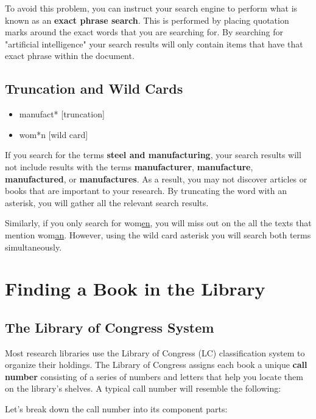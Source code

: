 {To avoid this problem, you can instruct your search engine to perform what is 
known as an \textbf{exact phrase search}. This is performed by placing 
quotation marks around the exact words that you are searching for. By searching 
for "artificial intelligence" your search results will only contain items that 
have that exact phrase within the document.

\subsection{Truncation and Wild Cards}
\begin{itemize}
\item manufact\** [truncation]
\item wom\**n [wild card]
\end{itemize}
If you search for the terms \textbf{steel and manufacturing}, your search 
results will not include results with the terms \textbf{manufacturer}, 
\textbf{manufacture}, \textbf{manufactured}, or \textbf{manufactures}. As a 
result, you may not discover articles or books that are important to your 
research. By truncating the word with an asterisk, you will gather all the 
relevant search results. 

Similarly, if you only search for wom\underline{en}, you will miss out on the 
all the texts that mention wom\underline{an}. However, using the wild card 
asterisk you will search both terms simultaneously.

\section{Finding a Book in the Library}

\subsection{The Library of Congress System}
Most research libraries use the Library of Congress (LC) classification system 
to organize their holdings. The Library of Congress assigns each book a unique 
\textbf{call number} consisting of a series of numbers and letters that help 
you locate them on the library's shelves. A typical call number will resemble 
the following: 

\begin{quote}
\hspace{.4in}{\huge F 24 .T39 1990}
\end{quote}

Let's break down the call number into its component parts:

}
